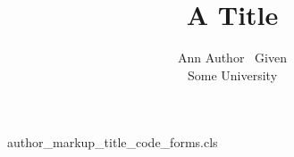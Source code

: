 \begin{filecontents*}{author_markup_title_code_forms.cls}
\def\maketitle{\par\begingroup\@maketitle\endgroup}
\def\@maketitle{{\Large\@title\par}%
  {\let\addr\itshape\newcommand\note [1] {[##1]}\def\email##1{\texttt{##1}}\def\dup{a}%
   {\def\dup{b}\def\name{\bfseries}\def\given{X}\begingroup\def\gone{G}\endgroup\@author\par}}}
\end{filecontents*}
\documentclass{author_markup_title_code_forms}
\newcommand\given{Given}
\title{A Title}
\author{\name Ann Author  \dup\ \given\\ \addr Some University\\ }

\maketitle
\ifdefined\name LEAK\else clean\fi\ \ifdefined\dup LEAK\else clean\fi

